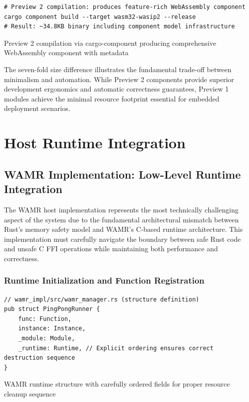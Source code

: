 \begin{listing}[H]
\begin{verbatim}
# Preview 2 compilation: produces feature-rich WebAssembly component
cargo component build --target wasm32-wasip2 --release
# Result: ~34.8KB binary including component model infrastructure
\end{verbatim}
\caption{Preview 2 compilation via cargo-component producing comprehensive WebAssembly component with metadata}
\label{lst:preview2-compilation}
\end{listing}

The seven-fold size difference illustrates the fundamental trade-off between minimalism and automation. While Preview 2 components provide superior development ergonomics and automatic correctness guarantees, Preview 1 modules achieve the minimal resource footprint essential for embedded deployment scenarios.

\section{Host Runtime Integration}
\label{sec:host-runtime-integration}

\subsection{WAMR Implementation: Low-Level Runtime Integration}

The WAMR host implementation represents the most technically challenging aspect of the system due to the fundamental architectural mismatch between Rust's memory safety model and WAMR's C-based runtime architecture. This implementation must carefully navigate the boundary between safe Rust code and unsafe C FFI operations while maintaining both performance and correctness.

\subsubsection{Runtime Initialization and Function Registration}

\begin{listing}[H]
\begin{verbatim}
// wamr_impl/src/wamr_manager.rs (structure definition)
pub struct PingPongRunner {
    func: Function,
    instance: Instance,
    _module: Module,
    _runtime: Runtime, // Explicit ordering ensures correct destruction sequence
}
\end{verbatim}
\caption{WAMR runtime structure with carefully ordered fields for proper resource cleanup sequence}
\label{lst:wamr-structure}
\end{listing}

